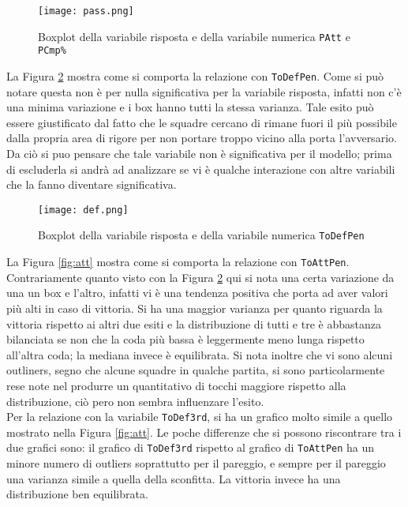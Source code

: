 \begin{figure}[htbp]
	\begin{center}
		\texttt{[image: pass.png]}
		\caption{Boxplot della variabile risposta e della variabile numerica \texttt{PAtt} e \texttt{PCmp\%}  } \label{fig:pass}
	\end{center}
\end{figure}

La Figura \ref{fig:defp} mostra come si comporta la relazione con \texttt{ToDefPen}. Come si può notare questa non è per nulla significativa per la variabile risposta, infatti non c'è una minima variazione e i box hanno tutti la stessa varianza. Tale esito può essere giustificato dal fatto che le squadre cercano di rimane fuori il più possibile dalla propria area di rigore per non portare troppo vicino alla porta l'avversario. Da ciò si puo pensare che tale variabile non è significativa per il modello; prima di escluderla si andrà ad analizzare se vi è qualche interazione con altre variabili che la fanno diventare significativa.\\

\begin{figure}[htbp]
	\begin{center}
		\texttt{[image: def.png]}
		\caption{Boxplot della variabile risposta e della variabile numerica \texttt{ToDefPen} } \label{fig:defp}
	\end{center}
\end{figure}

La Figura \ref{fig:att} mostra come si comporta la relazione con \texttt{ToAttPen}. Contrariamente quanto visto con la Figura \ref{fig:defp} qui si nota una certa variazione da una un box e l'altro, infatti vi è una tendenza positiva che porta ad aver valori più alti in caso di vittoria. Si ha una maggior varianza per quanto riguarda la vittoria rispetto ai altri due esiti e la distribuzione di tutti e tre è abbastanza bilanciata se non che la coda più bassa è leggermente meno lunga rispetto all'altra coda; la mediana invece è equilibrata. Si nota inoltre che vi sono alcuni outliners, segno che alcune squadre in qualche partita, si sono particolarmente rese note nel produrre un quantitativo di tocchi maggiore rispetto alla distribuzione, ciò pero non sembra influenzare l'esito.\\

Per la relazione con la variabile \texttt{ToDef3rd}, si ha un grafico molto simile a quello mostrato nella Figura \ref{fig:att}. Le poche differenze che si possono riscontrare tra i due grafici sono: il grafico di \texttt{ToDef3rd} rispetto al grafico di \texttt{ToAttPen} ha un minore numero di outliers soprattutto per il pareggio, e sempre per il pareggio una varianza simile a quella della sconfitta. La vittoria invece ha una distribuzione ben equilibrata.\\

